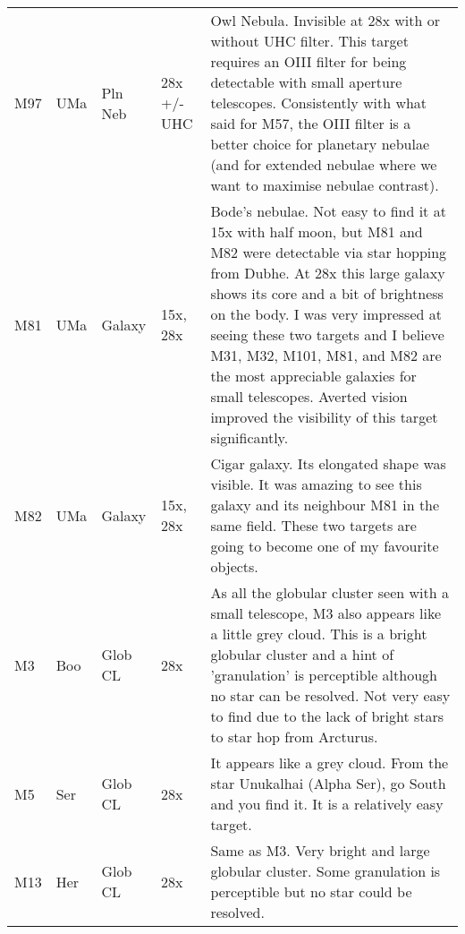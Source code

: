 \begin{longtable}{ p{0.8in}  p{0.3in}  p{0.5in}  p{0.9in}  p{5.8in} }
M97 & UMa & Pln Neb & 28x +/- UHC & Owl Nebula. Invisible at 28x with or without UHC filter. This target requires an OIII filter for being detectable with small aperture telescopes. Consistently with what said for M57, the OIII filter is a better choice for planetary nebulae (and for extended nebulae where we want to maximise nebulae contrast). \\ 
M81 & UMa & Galaxy & 15x, 28x & Bode's nebulae. Not easy to find it at 15x with half moon, but M81 and M82 were detectable via star hopping from Dubhe. At 28x this large galaxy shows its core and a bit of brightness on the body. I was very impressed at seeing these two targets and I believe M31, M32, M101, M81, and M82 are the most appreciable galaxies for small telescopes. Averted vision improved the visibility of this target significantly. \\ 
M82 & UMa & Galaxy & 15x, 28x & Cigar galaxy. Its elongated shape was visible. It was amazing to see this galaxy and its neighbour M81 in the same field. These two targets are going to become one of my favourite objects.   \\ 
M3 & Boo & Glob CL & 28x & As all the globular cluster seen with a small telescope, M3 also appears like a little grey cloud. This is a bright globular cluster and a hint of 'granulation' is perceptible although no star can be resolved. Not very easy to find due to the lack of bright stars to star hop from Arcturus. \\ 
M5 & Ser & Glob CL & 28x & It appears like a grey cloud. From the star Unukalhai (Alpha Ser), go South and you find it. It is a relatively easy target.  \\ 
M13 & Her & Glob CL & 28x & Same as M3. Very bright and large globular cluster. Some granulation is perceptible but no star could be resolved. \\ 
\hline 
\end{longtable} 
